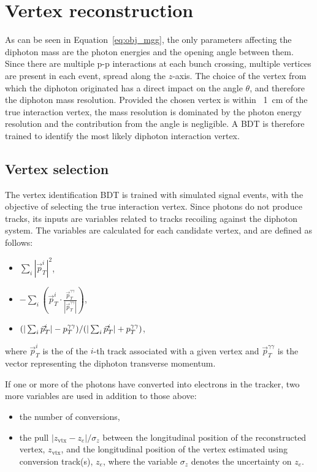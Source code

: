 \section{Vertex reconstruction}

As can be seen in Equation~\ref{eq:obj_mgg}, 
the only parameters affecting the diphoton mass are the photon energies and the opening angle between them.
Since there are multiple p-p interactions at each bunch crossing, multiple vertices are present in each event, spread along the $z$-axis.
The choice of the vertex from which the diphoton originated has a direct impact on the angle $\theta$, 
and therefore the diphoton mass resolution.
Provided the chosen vertex is within ~\SI{1}{cm} of the true interaction vertex,
the mass resolution is dominated by the photon energy resolution and the contribution from the angle is negligible.
A BDT is therefore trained to identify the most likely diphoton interaction vertex.

\subsection{Vertex selection}

The vertex identification BDT is trained with simulated \Hgg signal events, 
with the objective of selecting the true interaction vertex.
Since photons do not produce tracks, its inputs are variables related to tracks
recoiling against the diphoton system.
The variables are calculated for each candidate vertex, and are defined as follows:
\begin{itemize}
        \item $\sum_{i}|\vec{p}_T^{i}|^{2}$,
        \item $\displaystyle -\sum_{i}(\vec{p}_T^{i}\cdot \frac{\vec{p}_T^{\gamma\gamma}}{|\vec{p}_T^{\gamma\gamma}|})$,
        \item $(|\sum_{i}\vec{p}_T^{i}| - p_T^{\gamma\gamma})/(|\sum_{i}\vec{p}_T^{i}| + p_T^{\gamma\gamma})$,
\end{itemize}
where $\vec{p}_T^{i}$ is the \pt of the $i$-th track
associated with a given vertex 
and $\vec{p}_T^{\gamma\gamma}$ is the vector representing the diphoton transverse momentum.

If one or more of the photons have converted into electrons in the tracker, 
two more variables are used in addition to those above:
\begin{itemize}
        \item the number of conversions,
        \item the pull $|z_{\text{vtx}} - z_e| /\sigma_{z}$ between the
                longitudinal position of the reconstructed vertex,
                $z_{\text{vtx}}$, and the longitudinal position of the
                vertex estimated using conversion track(s), $z_e$,
                where the variable $\sigma_{z}$ denotes the uncertainty 
                on $z_e$.
\end{itemize}

